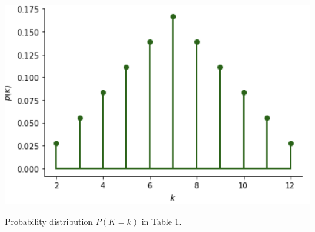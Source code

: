 \documentclass{tufte-handout}
\begin{document}
\begin{marginfigure}
\centering
\includegraphics{fig/disc.png}

\caption{Probability distribution  $P(K=k) $ in  Table 1.
}
\end{marginfigure}
\end{document}
